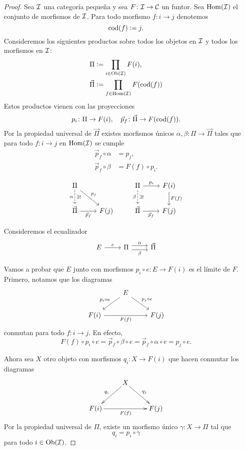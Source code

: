 \documentclass{article}
\numberwithin{equation}{section}
\theoremstyle{definition}
\begin{document}
\begin{proof}
  Sea $\mathcal{I}$ una categoría pequeña y sea $F\colon \mathcal{I}\to\mathcal{C}$
  un funtor. Sea $\operatorname{Hom} (\mathcal{I})$ el conjunto de morfismos de
  $\mathcal{I}$. Para todo morfismo $f\colon i\to j$ denotemos
  $$\operatorname{cod} (f) \mathrel{\mathop:}= j.$$
  Consideremos los siguientes productos sobre todos los objetos en $\mathcal{I}$
  y todos los morfismos en $\mathcal{I}$:
  \begin{align*}
    \Pi & \mathrel{\mathop:}= \prod_{i\in \operatorname{Ob}(\mathcal{I})} F(i),\\
    \vec{\Pi} & \mathrel{\mathop:}= \prod_{f\in \operatorname{Hom} (\mathcal{I})} F (\operatorname{cod} (f))
  \end{align*}
  Estos productos vienen con las proyecciones
  $$p_i\colon \Pi \to F(i), \quad \vec{p}_f\colon \vec{\Pi} \to F (\operatorname{cod} (f)).$$
  Por la propiedad universal de $\vec{\Pi}$ existes morfismos únicos
  $\alpha,\beta\colon \Pi \to \vec{\Pi}$ tales que para todo $f\colon i\to j$ en
  $\operatorname{Hom} (\mathcal{I})$ se cumple
  \begin{align*}
    \vec{p}_f\circ\alpha & = p_j,\\
    \vec{p}_f\circ \beta & = F(f)\circ p_i.
  \end{align*}

  \[ \begin{tikzcd}
      \Pi\ar[dashed]{d}[swap]{\alpha}{\exists !}\ar{dr}{p_j} & & \Pi\ar[dashed]{d}[swap]{\beta}{\exists !} \ar{r}{p_i} & F (i)\ar{d}{F (f)} \\
      \vec{\Pi} \ar{r}[swap]{\vec{p}_f} & F (j) & \vec{\Pi} \ar{r}[swap]{\vec{p}_f} & F (j)
    \end{tikzcd} \]

  Consideremos el ecualizador
  \[ \begin{tikzcd}
      E\ar{r}{e} & \Pi\ar[shift left=0.3em]{r}{\alpha}\ar[shift right=0.3em]{r}[swap]{\beta} & \vec{\Pi}
    \end{tikzcd} \]

  Vamos a probar que $E$ junto con morfismos $p_i\circ e\colon E\to F (i)$ es el límite de $F$. Primero, notamos que los diagramas
  $$\begin{tikzcd}
    & E\ar{dl}[swap]{p_i\circ e}\ar{dr}{p_j\circ e} \\
    F (i)\ar{rr}[swap]{F (f)} & & F (j)
  \end{tikzcd}$$
  conmutan para todo $f\colon i\to j$. En efecto,
  $$F(f)\circ p_i\circ e = \vec{p}_f\circ\beta\circ e = \vec{p}_f\circ\alpha\circ e = p_j\circ e.$$

  Ahora sea $X$ otro objeto con morfismos $q_i\colon X\to F (i)$ que hacen conmutar los diagramas
  $$\xymatrix{
    & X\ar[dl]_{q_i}\ar[dr]^{q_j} \\
    F(i)\ar[rr]_{F(f)} & & F(j)
  }$$
  Por la propiedad universal de $\Pi$, existe un morfismo único $
  \gamma\colon X \to \Pi$ tal que
  $$q_i = p_i\circ\gamma$$
  para todo $i\in\operatorname{Ob}(\mathcal{I})$.


\end{proof}
\end{document}
